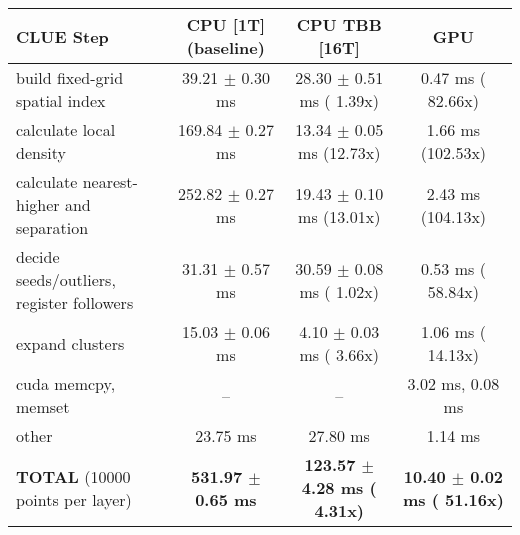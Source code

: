     \begin{tabular}{l|c|c|c}
    \hline
    CLUE Step                                 & CPU [1T] (baseline)         & CPU TBB [16T]                         & GPU                       \\ \hline
    build fixed-grid spatial index            &  39.21 $\pm$  0.30 ms       &  28.30 $\pm$  0.51 ms ( 1.39x)        &   0.47 ms ( 82.66x)       \\
    calculate local density                   & 169.84 $\pm$  0.27 ms       &  13.34 $\pm$  0.05 ms (12.73x)        &   1.66 ms (102.53x)       \\
    calculate nearest-higher and separation   & 252.82 $\pm$  0.27 ms       &  19.43 $\pm$  0.10 ms (13.01x)        &   2.43 ms (104.13x)       \\
    decide seeds/outliers, register followers &  31.31 $\pm$  0.57 ms       &  30.59 $\pm$  0.08 ms ( 1.02x)        &   0.53 ms ( 58.84x)       \\
    expand clusters                           &  15.03 $\pm$  0.06 ms       &   4.10 $\pm$  0.03 ms ( 3.66x)        &   1.06 ms ( 14.13x)       \\ \hline
    cuda memcpy, memset                       & --                          & --                                    &   3.02 ms,   0.08 ms      \\ 
    other                                     &  23.75 ms                   &  27.80 ms                             &   1.14 ms                 \\ \hline
    \textbf{TOTAL} (10000 points per layer)   & \textbf{531.97 $\pm$  0.65 ms} & \textbf{123.57 $\pm$  4.28 ms ( 4.31x)} & \textbf{ 10.40 $\pm$  0.02 ms ( 51.16x)}  \\
    \hline 
    \end{tabular}
    \linebreak


